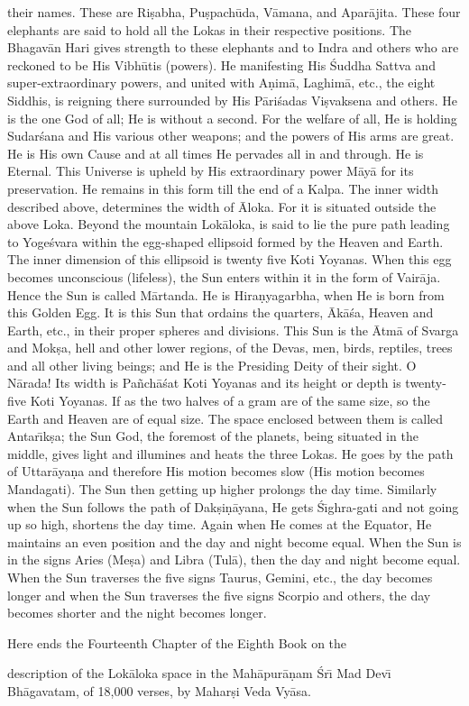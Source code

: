 their names. These are Ri\d{s}abha, Pu\d{s}pach\=uda, V\=amana, and Apar\=ajita. These four elephants are said to hold all the Lokas in their respective positions. The Bhagav\=an Hari gives strength to these elephants and to Indra and others who are reckoned to be His Vibh\=utis (powers). He manifesting His \'Suddha Sattva and super-extraordinary powers, and united with A\d{n}im\=a, Laghim\=a, etc., the eight Siddhis, is reigning there surrounded by His P\=ari\'sadas Vi\d{s}vaksena and others. He is the one God of all; He is without a second. For the welfare of all, He is holding Sudar\'sana and His various other weapons; and the powers of His arms are great. He is His own Cause and at all times He pervades all in and through. He is Eternal. This Universe is upheld by His extraordinary power M\=ay\=a for its preservation. He remains in this form till the end of a Kalpa. The inner width described above, determines the width of \=Aloka. For it is situated outside the above Loka. Beyond the mountain Lok\=aloka, is said to lie the pure path leading to Yoge\'svara within the egg-shaped ellipsoid formed by the Heaven and Earth. The inner dimension of this ellipsoid is twenty five Koti Yoyanas. When this egg becomes unconscious (lifeless), the Sun enters within it in the form of Vair\=aja. Hence the Sun is called M\=artanda. He is Hira\d{n}yagarbha, when He is born from this Golden Egg. It is this Sun that ordains the quarters, \=Ak\=a\'sa, Heaven and Earth, etc., in their proper spheres and divisions. This Sun is the \=Atm\=a of Svarga and Mok\d{s}a, hell and other lower regions, of the Devas, men, birds, reptiles, trees and all other living beings; and He is the Presiding Deity of their sight. O N\=arada! Its width is Pa\~nch\=a\'sat Koti Yoyanas and its height or depth is twenty-five Koti Yoyanas. If as the two halves of a gram are of the same size, so the Earth and Heaven are of equal size. The space enclosed between them is called Antar\={\i}k\d{s}a; the Sun God, the foremost of the planets, being situated in the middle, gives light and illumines and heats the three Lokas. He goes by the path of Uttar\=aya\d{n}a and therefore His motion becomes slow (His motion becomes Mandagati). The Sun then getting up higher prolongs the day time. Similarly when the Sun follows the path of Dak\d{s}i\d{n}\=ayana, He gets \'S\={\i}ghra-gati and not going up so high, shortens the day time. Again when He comes at the Equator, He maintains an even position and the day and night become equal. When the Sun is in the signs Aries (Me\d{s}a) and Libra (Tul\=a), then the day and night become equal. When the Sun traverses the five signs Taurus, Gemini, etc., the day becomes longer and when the Sun traverses the five signs Scorpio and others, the day becomes shorter and the night becomes longer.

Here ends the Fourteenth Chapter of the Eighth Book on the

description of the Lok\=aloka space in the Mah\=apur\=a\d{n}am \'Sr\={\i} Mad Dev\={\i} Bh\=agavatam, of 18,000 verses, by Mahar\d{s}i Veda Vy\=asa.



